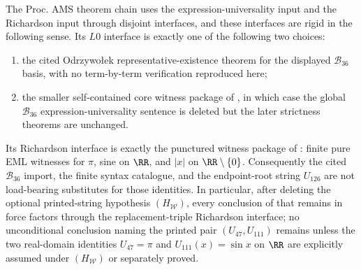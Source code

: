 \begin{theorem}
\label{thm:L0-richardson-exact-load-bearing-cut}
\label{thm:submission-interface-rigidity}
The Proc. AMS theorem chain uses the expression-universality input and the
Richardson input through disjoint interfaces, and these interfaces are rigid in
the following sense.  Its \(L0\) interface is exactly one of the following two
choices:
\begin{enumerate}
\item the cited Odrzywo{\l}ek representative-existence theorem for the displayed
  \(\mathcal B_{36}\) basis, with no term-by-term verification reproduced here;
\item the smaller self-contained core witness package of
  , in which case the global
  \(\mathcal B_{36}\) expression-universality sentence is deleted but the later
  strictness theorems are unchanged.
\end{enumerate}
Its Richardson interface is exactly the punctured witness package of
: finite pure EML
witnesses for \(\pi\), sine on \(\RR\), and \(|x|\) on
\(\RR\setminus\{0\}\).  Consequently the cited
\(\mathcal B_{36}\) import, the finite syntax catalogue, and the endpoint-root
string \(U_{126}\) are not load-bearing substitutes for those identities.  In
particular, after deleting the optional printed-string hypothesis
\((H_{\mathcal W})\), every conclusion of  that remains
in force factors through the replacement-triple Richardson interface; no
unconditional conclusion naming the printed pair \((U_{47},U_{111})\) remains
unless the two real-domain identities \(U_{47}=\pi\) and
\(U_{111}(x)=\sin x\) on \(\RR\) are explicitly assumed under
\((H_{\mathcal W})\) or separately proved.
\end{theorem}

